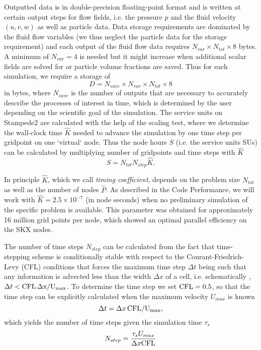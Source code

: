 \documentclass[10pt]{article}
\newcommand{\beq}{\begin{equation}}
\newcommand{\eeq}{ \end{equation} }
\begin{document}
 Outputted data is in double-precision floating-point format and is written at certain output steps for  flow fields, i.e. the pressure $p$ and the fluid velocity $(u,v,w)$ as well as particle data. Data storage requirements are dominated by the fluid flow variables (we thus neglect the particle data for the storage requirement) and each output of the fluid flow data requires $N_{var}\times N_{tot}\times 8$ bytes. A minimum of $N_{var}=4$ is needed but it might increase when additional scalar fields are solved for or particle volume fractions are saved. Thus for each simulation, we require a storage  of
\begin{equation}
 D=N_{save}\times N_{var}\times N_{tot}\times  8 
\end{equation}
in bytes, where $N_{save}$ is the number of outputs that are necessary to accurately describe the processes of interest in time, which is determined by the user depending on the scientific goal of the simulation. The service units on Stampede2 are calculated with the help of the scaling test, where we determine the wall-clock time $\hat K$ needed to advance the simulation by one time step per gridpoint on one `virtual` node. Thus the node hours $S$  (i.e. the service units SUs) can be calculated by multiplying  number of gridpoints and time steps with $\hat K$
\begin{equation}
S = N_{tot}N_{step} \hat K. \label{eq:SU}
\end{equation}

 In principle $\hat K$, which we call \emph{timing coefficient},  depends on the problem size $N_{tot}$ as well as the number of nodes $\hat P$. As described in the {Code Performance}, we will work with  $\hat K = 2.5 \times 10^{-7}$ (in node seconds) when no preliminary simulation of the specific problem is available. This parameter was obtained for approximately 16 million grid points per node, which showed an optimal parallel efficiency on the SKX nodes.
 
 
The number of time steps $N_{step}$ can be calculated from the fact that time-stepping scheme is conditionally stable with respect to the Courant-Friedrich-Levy (CFL) conditions that forces the maximum time step $\Delta t$ being such that any information is advected less  than the width $\Delta x$ of a cell, i.e. schematically , $\Delta t< \rm{CFL}\, \Delta x/ U_{max}$. To determine the time step we set $\rm{CFL}=0.5$, so that the time step can be explicitly calculated when the maximum velocity $U_{max}$ is known
\begin{equation}
\Delta t= \Delta x \, \rm{CFL}/  U_{max},  \label{eq:cfl:cond}
\end{equation}
which yields the number of time steps given the simulation time $\tau_s$
\beq
N_{step} = \frac{\tau_s U_{max}}{\Delta x \rm{CFL}} \label{eq:steps}
\eeq
\end{document}
